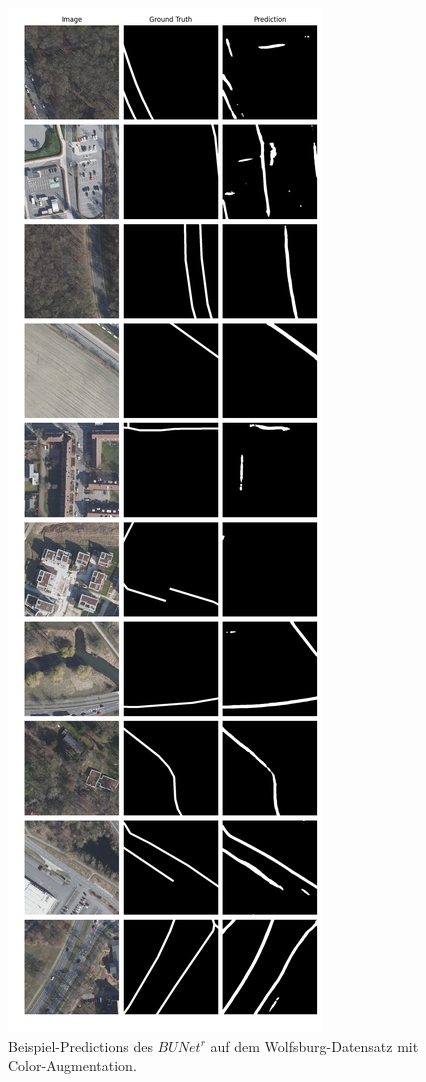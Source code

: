 \begin{figure}
	\centering
	\includegraphics[width=.41\textwidth]{Bilder/wolfsburg-color-samples/bunet2-r.png}
	\caption{Beispiel-Predictions des $BUNet^r$ auf dem Wolfsburg-Datensatz mit Color-Augmentation.}
	\label{fig:wolfsburg-color-samples-bunet2-r}
\end{figure}

